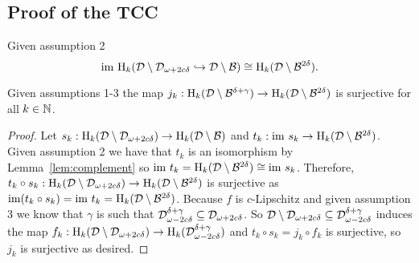 
\subsection{Proof of the TCC}

\begin{lemma}\label{lem:complement}
    Given assumption 2 \[\mathrm{im}~\mathrm{H}_k({\mathcal{D}}\setminus{\mathcal{D}}_{\omega+2c\delta}\hookrightarrow {\mathcal{D}}\setminus{\mathcal{B}})\cong\mathrm{H}_k({\mathcal{D}}\setminus{\mathcal{B}}^{2\delta}).\]
\end{lemma}

\begin{lemma}\label{lem:jsurj}
    Given assumptions 1-3 the map $j_k:\mathrm{H}_k({\mathcal{D}}\setminus{\mathcal{B}}^{\delta+\gamma})\to\mathrm{H}_k({\mathcal{D}}\setminus{\mathcal{B}}^{2\delta})$ is surjective for all $k\in\mathbb{N}$.
\end{lemma}
\begin{proof}
    Let $s_k : \mathrm{H}_k({\mathcal{D}}\setminus{\mathcal{D}}_{\omega+2c\delta})\to\mathrm{H}_k({\mathcal{D}}\setminus{\mathcal{B}})$ and $t_k : \mathrm{im}~s_k\to\mathrm{H}_k({\mathcal{D}}\setminus{\mathcal{B}}^{2\delta})$.
    Given assumption 2 we have that $t_k$ is an isomorphism by Lemma~\ref{lem:complement} so $\mathrm{im}~t_k = \mathrm{H}_k({\mathcal{D}}\setminus{\mathcal{B}}^{2\delta})\cong\mathrm{im}~s_k$.
    Therefore, $t_k\circ s_k : \mathrm{H}_k({\mathcal{D}}\setminus{\mathcal{D}}_{\omega+2c\delta})\to\mathrm{H}_k({\mathcal{D}}\setminus{\mathcal{B}}^{2\delta})$ is surjective as $\mathrm{im}(t_k\circ s_k) = \mathrm{im}~t_k = \mathrm{H}_k({\mathcal{D}}\setminus{\mathcal{B}}^{2\delta})$.
    Because $f$ is $c$-Lipschitz and given assumption 3 we know that $\gamma$ is such that ${\mathcal{D}}_{\omega-2c\delta}^{\delta+\gamma}\subseteq {\mathcal{D}}_{\omega+2c\delta}$.
    So ${\mathcal{D}}\setminus{\mathcal{D}}_{\omega+2c\delta}\subseteq{\mathcal{D}}_{\omega-2c\delta}^{\delta+\gamma}$ induces the map $f_k : \mathrm{H}_k({\mathcal{D}}\setminus{\mathcal{D}}_{\omega+2c\delta})\to\mathrm{H}_k({\mathcal{D}}_{\omega-2c\delta}^{\delta+\gamma})$ and $t_k\circ s_k = j_k\circ f_k$ is surjective, so $j_k$ is surjective as desired.
\end{proof}

